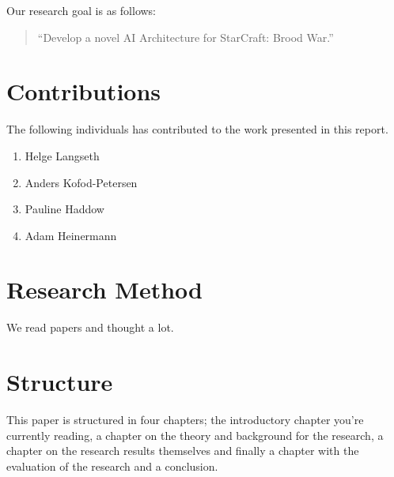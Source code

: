 Our research goal is as follows:
\begin{quote}
 ``Develop a novel AI Architecture for StarCraft: Brood War.''
\end{quote}


\section{Contributions}
The following individuals has contributed to the work presented in this report.

\begin{enumerate}
 \item Helge Langseth
 \item Anders Kofod-Petersen
 \item Pauline Haddow
 \item Adam Heinermann
\end{enumerate}


\section{Research Method}
We read papers and thought a lot.


\section{Structure}
This paper is structured in four chapters; the introductory chapter you're
currently reading, a chapter on the theory and background for the research, a
chapter on the research results themselves and finally a chapter with the
evaluation of the research and a conclusion.